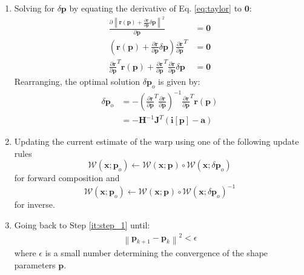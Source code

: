 \begin{enumerate}
    \item Solving for $\delta\mathbf{p}$ by equating the derivative of Eq. \ref{eq:taylor} to $\mathbf{0}$:
    \begin{equation}
        \begin{aligned}
            \frac{\partial \left\| \mathbf{r}(\mathbf{p}) + \frac{\partial\mathbf{r}}{\partial\mathbf{p}} \delta\mathbf{p} \right\|^2}{\partial \mathbf{p}} & = \mathbf{0} 
            \\
            \left(\mathbf{r}(\mathbf{p}) + \frac{\partial\mathbf{r}}{\partial\mathbf{p}} \delta\mathbf{p} \right) \frac{\partial\mathbf{r}}{\partial\mathbf{p}}^T  & = \mathbf{0} 
            \\
            \frac{\partial\mathbf{r}}{\partial\mathbf{p}}^T \mathbf{r}(\mathbf{p}) + \frac{\partial\mathbf{r}}{\partial\mathbf{p}}^T \frac{\partial\mathbf{r}}{\partial\mathbf{p}} \delta\mathbf{p} & = \mathbf{0} 
        \label{eq:taylor}
        \end{aligned}
    \end{equation}
    Rearranging, the optimal solution $\delta\mathbf{p}_o$ is given by:
    \begin{equation}
        \begin{aligned}
            \delta\mathbf{p}_o & = - \left( \frac{\partial\mathbf{r}}{\partial\mathbf{p}}^T \frac{\partial\mathbf{r}}{\partial\mathbf{p}} \right)^{-1} \frac{\partial\mathbf{r}}{\partial\mathbf{p}}^T \mathbf{r}(\mathbf{p})
            \\
            & = - \mathbf{H}^{-1} \mathbf{J}^T \left( \mathbf{i}[\mathbf{p}] - \mathbf{a} \right)
        \label{eq:solve_dp}
        \end{aligned}
    \end{equation}
    
    \item Updating the current estimate of the warp using one of the following update rules
    \begin{equation}
        \mathcal{W}(\mathbf{x}; \mathbf{p}_o) \leftarrow \mathcal{W}(\mathbf{x}; \mathbf{p}) \circ \mathcal{W}(\mathbf{x}; \delta \mathbf{p}_o) 
        \label{eq:fc_update}
    \end{equation}
    for forward composition and
    \begin{equation}
        \mathcal{W}(\mathbf{x}; \mathbf{p}_o) \leftarrow \mathcal{W}(\mathbf{x}; \mathbf{p}) \circ \mathcal{W}(\mathbf{x}; \delta \mathbf{p}_o)^{-1} 
        \label{eq:ic_update}
    \end{equation}
    for inverse.
    
    \item Going back to Step \ref{it:step_1} until: 
    \begin{equation}
        \begin{aligned}
            \left\| \mathbf{p}_{k+1} - \mathbf{p}_k \right\|^2 < \epsilon
        \end{aligned}
    \end{equation}
    where $\epsilon$ is a small number determining the convergence of the shape parameters $\mathbf{p}$.
\end{enumerate}
